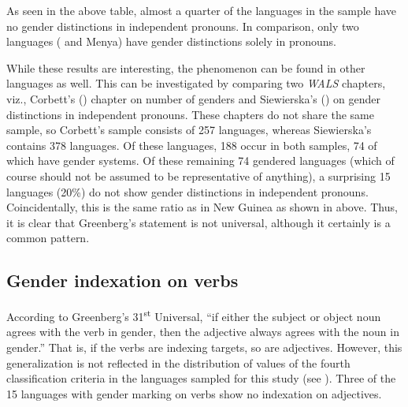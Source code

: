 \documentclass[output=collectionpaper]{langsci/langscibook}
\begin{document}

As seen in the above table, almost a quarter of the languages in the sample have no gender distinctions in independent pronouns. In comparison, only two languages ( and Menya) have gender distinctions solely in pronouns.


While these results are interesting, the phenomenon can be found in other languages as well. This can be investigated by comparing two \textit{WALS} chapters, viz., Corbett's (\citealt*{Corbett2013}) chapter on number of genders and Siewierska's (\citealt*{Siewierska2013}) on gender distinctions in independent pronouns. These chapters do not share the same sample, so Corbett's sample consists of 257 languages, whereas Siewierska's contains 378 languages. Of these languages, 188 occur in both samples, 74 of which have gender systems. Of these remaining 74 gendered languages (which of course should not be assumed to be representative of anything), a surprising 15 languages (20\%) do not show gender distinctions in independent pronouns. Coincidentally, this is the same ratio as in New Guinea as shown in  above. Thus, it is clear that Greenberg's statement is not universal, although it certainly is a common pattern.


\subsection{Gender indexation on verbs}


According to Greenberg's 31\textsuperscript{st} Universal, ``if either the subject or object noun agrees with the verb in gender, then the adjective always agrees with the noun in gender.'' That is, if the verbs are indexing targets, so are adjectives. However, this generalization is not reflected in the distribution of values of the fourth classification criteria in the languages sampled for this study (see ). Three of the 15 languages with gender marking on verbs show no indexation on adjectives.
\end{document}
